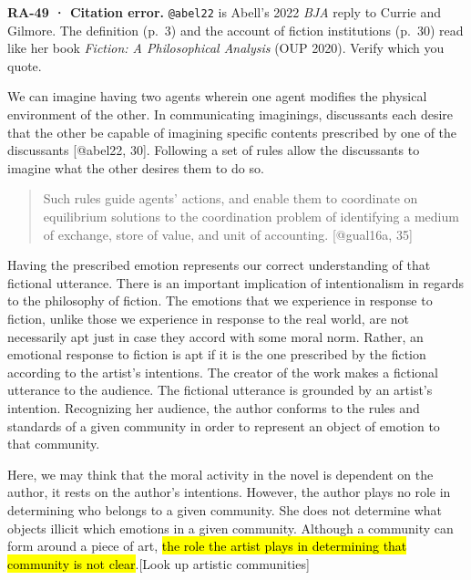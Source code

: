 \documentclass[
  letterpaper,
  DIV=11,
  numbers=noendperiod]{scrartcl}
\theoremstyle{remark}
\begin{document}
\begin{tcolorbox}[enhanced jigsaw, arc=.35mm, bottomrule=.15mm, bottomtitle=1mm, breakable, colback=white, colbacktitle=quarto-callout-warning-color!10!white, colframe=quarto-callout-warning-color-frame, coltitle=black, left=2mm, leftrule=.75mm, opacityback=0, opacitybacktitle=0.6, rightrule=.15mm, title=\textcolor{quarto-callout-warning-color}{\faExclamationTriangle}\hspace{0.5em}{Warning}, titlerule=0mm, toprule=.15mm, toptitle=1mm]

\textbf{RA-49 · Citation error.} \texttt{@abel22} is Abell's 2022
\emph{BJA} reply to Currie and Gilmore. The definition (p.~3) and the
account of fiction institutions (p.~30) read like her book
\emph{Fiction: A Philosophical Analysis} (OUP 2020). Verify which you
quote.

\end{tcolorbox}

We can imagine having two agents wherein one agent modifies the physical
environment of the other. In communicating imaginings, discussants each
desire that the other be capable of imagining specific contents
prescribed by one of the discussants {[}@abel22, 30{]}. Following a set
of rules allow the discussants to imagine what the other desires them to
do so.

\begin{quote}
Such rules guide agents' actions, and enable them to coordinate on
equilibrium solutions to the coordination problem of identifying a
medium of exchange, store of value, and unit of accounting. {[}@gual16a,
35{]}
\end{quote}

Having the prescribed emotion represents our correct understanding of
that fictional utterance. There is an important implication of
intentionalism in regards to the philosophy of fiction. The emotions
that we experience in response to fiction, unlike those we experience in
response to the real world, are not necessarily apt just in case they
accord with some moral norm. Rather, an emotional response to fiction is
apt if it is the one prescribed by the fiction according to the artist's
intentions. The creator of the work makes a fictional utterance to the
audience. The fictional utterance is grounded by an artist's intention.
Recognizing her audience, the author conforms to the rules and standards
of a given community in order to represent an object of emotion to that
community.

Here, we may think that the moral activity in the novel is dependent on
the author, it rests on the author's intentions. However, the author
plays no role in determining who belongs to a given community. She does
not determine what objects illicit which emotions in a given community.
Although a community can form around a piece of art, \hl{the role the
artist plays in determining that community is not clear}.{[}Look up
artistic communities{]}
\end{document}
